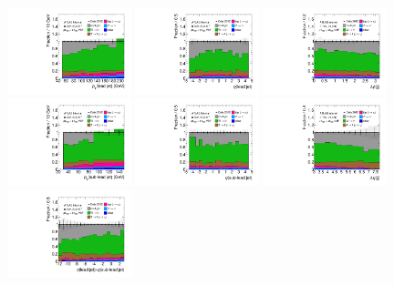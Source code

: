 \begin{figure}[tp]
  \centering
  \includegraphics[width=0.32\textwidth]{figures/rx/vbf-mvaSR/jet-1-pt}
  \includegraphics[width=0.32\textwidth]{figures/rx/vbf-mvaSR/jet-1-eta}
  \includegraphics[width=0.32\textwidth]{figures/rx/vbf-mvaSR/jets-dphi}
  \includegraphics[width=0.32\textwidth]{figures/rx/vbf-mvaSR/jet-2-pt}
  \includegraphics[width=0.32\textwidth]{figures/rx/vbf-mvaSR/jet-2-eta}
  \includegraphics[width=0.32\textwidth]{figures/rx/vbf-mvaSR/jets-deta}
  \includegraphics[width=0.32\textwidth]{figures/rx/vbf-mvaSR/jets-etaprod}

\end{figure}
